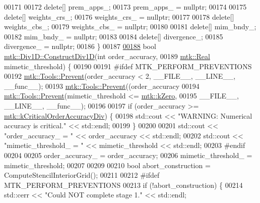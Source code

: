\begin{DoxyCode}
00171 
00172   \textcolor{keyword}{delete}[] prem\_apps\_;
00173   prem\_apps\_ = \textcolor{keyword}{nullptr};
00174 
00175   \textcolor{keyword}{delete}[] weights\_crs\_;
00176   weights\_crs\_ = \textcolor{keyword}{nullptr};
00177 
00178   \textcolor{keyword}{delete}[] weights\_cbs\_;
00179   weights\_cbs\_ = \textcolor{keyword}{nullptr};
00180 
00181   \textcolor{keyword}{delete}[] mim\_bndy\_;
00182   mim\_bndy\_ = \textcolor{keyword}{nullptr};
00183 
00184   \textcolor{keyword}{delete}[] divergence\_;
00185   divergence\_ = \textcolor{keyword}{nullptr};
00186 \}
00187 
\hypertarget{mtk__div__1d_8cc_source_l00188}{}\hyperlink{classmtk_1_1Div1D_a52fcd1542f11e606e36bd188e48bfdf7}{00188} \textcolor{keywordtype}{bool} \hyperlink{classmtk_1_1Div1D_a52fcd1542f11e606e36bd188e48bfdf7}{mtk::Div1D::ConstructDiv1D}(\textcolor{keywordtype}{int} order\_accuracy,
00189                                 \hyperlink{group__c01-roots_gac080bbbf5cbb5502c9f00405f894857d}{mtk::Real} mimetic\_threshold) \{
00190 
00191 \textcolor{preprocessor}{  #ifdef MTK\_PERFORM\_PREVENTIONS}
00192   \hyperlink{classmtk_1_1Tools_a332324c6f25e66be9dff48c5987a3b9f}{mtk::Tools::Prevent}(order\_accuracy < 2, \_\_FILE\_\_, \_\_LINE\_\_, \_\_func\_\_);
00193   \hyperlink{classmtk_1_1Tools_a332324c6f25e66be9dff48c5987a3b9f}{mtk::Tools::Prevent}((order\_accuracy%
00194   \hyperlink{classmtk_1_1Tools_a332324c6f25e66be9dff48c5987a3b9f}{mtk::Tools::Prevent}(mimetic\_threshold <= \hyperlink{group__c01-roots_ga59a451a5fae30d59649bcda274fea271}{mtk::kZero},
00195                       \_\_FILE\_\_, \_\_LINE\_\_, \_\_func\_\_);
00196 
00197   \textcolor{keywordflow}{if} (order\_accuracy >= \hyperlink{group__c01-roots_ga0898eef2108473e44a5223932d571c31}{mtk::kCriticalOrderAccuracyDiv}) \{
00198     std::cout << \textcolor{stringliteral}{"WARNING: Numerical accuracy is critical."} << std::endl;
00199   \}
00200 
00201   std::cout << \textcolor{stringliteral}{"order\_accuracy\_ = "} << order\_accuracy << std::endl;
00202   std::cout << \textcolor{stringliteral}{"mimetic\_threshold\_ = "} << mimetic\_threshold << std::endl;
00203 \textcolor{preprocessor}{  #endif}
00204 
00205   order\_accuracy\_ = order\_accuracy;
00206   mimetic\_threshold\_ = mimetic\_threshold;
00207 
00209 
00210   \textcolor{keywordtype}{bool} abort\_construction = ComputeStencilInteriorGrid();
00211 
00212 \textcolor{preprocessor}{  #ifdef MTK\_PERFORM\_PREVENTIONS}
00213   \textcolor{keywordflow}{if} (!abort\_construction) \{
00214     std::cerr << \textcolor{stringliteral}{"Could NOT complete stage 1."} << std::endl;

\end{DoxyCode}

